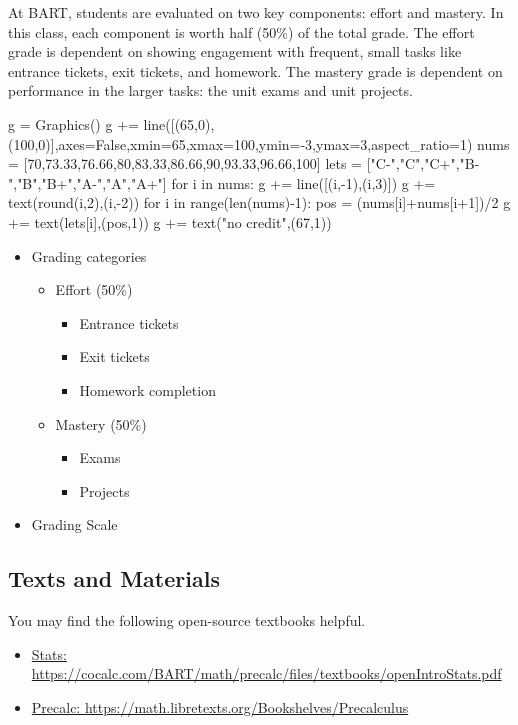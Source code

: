 \documentclass[12pt]{article}
\begin{document}
At BART, students are evaluated on two key components: effort and mastery. In this class, each component is worth half (50\%) of the total grade. The effort grade is dependent on showing engagement with frequent, small tasks like entrance tickets, exit tickets, and homework. The mastery grade is dependent on performance in the larger tasks: the unit exams and unit projects.

\begin{sagesilent}
g = Graphics()
g += line([(65,0),(100,0)],axes=False,xmin=65,xmax=100,ymin=-3,ymax=3,aspect_ratio=1)
nums = [70,73.33,76.66,80,83.33,86.66,90,93.33,96.66,100]
lets = ["C-","C","C+","B-","B","B+","A-","A","A+"]
for i in nums:
    g += line([(i,-1),(i,3)])
    g += text(round(i,2),(i,-2))
for i in range(len(nums)-1):
    pos = (nums[i]+nums[i+1])/2
    g += text(lets[i],(pos,1))
g += text("no credit",(67,1))
\end{sagesilent}

\begin{itemize}
\item Grading categories
\begin{itemize}
\item Effort (50\%)
\begin{itemize}
\item Entrance tickets
\item Exit tickets
\item Homework completion
\end{itemize}
\item Mastery (50\%)
\begin{itemize}
\item Exams
\item Projects
\end{itemize}
\end{itemize}
\item Grading Scale \newline {}
\end{itemize}


\subsection*{Texts and Materials}

You may find the following open-source textbooks helpful.

\begin{itemize}
\item \href{https://cocalc.com/BART/math/precalc/files/textbooks/openIntroStats.pdf}{Stats: https://cocalc.com/BART/math/precalc/files/textbooks/openIntroStats.pdf}
\item \href{https://math.libretexts.org/Bookshelves/Precalculus}{Precalc: https://math.libretexts.org/Bookshelves/Precalculus}
\end{itemize}
\end{document}
